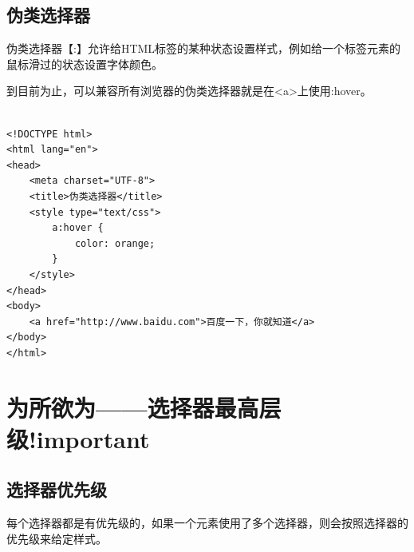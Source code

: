 \subsection{伪类选择器}

伪类选择器【:】允许给HTML标签的某种状态设置样式，例如给一个标签元素的鼠标滑过的状态设置字体颜色。

\begin{table}[H]
	\centering
	\caption{常用伪类选择器}
\end{table}

到目前为止，可以兼容所有浏览器的伪类选择器就是在<a>上使用:hover。 \\

 \\
\begin{lstlisting}[style=htmlcssjs]
<!DOCTYPE html>
<html lang="en">
<head>
    <meta charset="UTF-8">
    <title>伪类选择器</title>
    <style type="text/css">
        a:hover {
            color: orange;
        }
    </style>
</head>
<body>
    <a href="http://www.baidu.com">百度一下，你就知道</a>
</body>
</html>
\end{lstlisting}

\newpage

\section{为所欲为——选择器最高层级!important}

\subsection{选择器优先级}

每个选择器都是有优先级的，如果一个元素使用了多个选择器，则会按照选择器的优先级来给定样式。 \\

